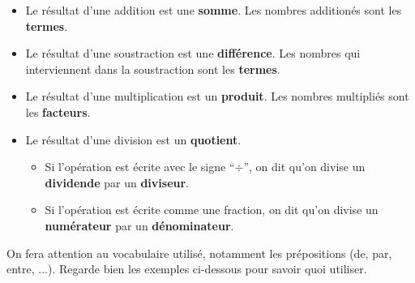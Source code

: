 \documentclass[../€Cours-complet/Cours-complet]{subfiles}
\begin{document}
\maketitleCours

\begin{cours}[Vocabulaire]
	\begin{itemize}
		\item Le résultat d'une addition est une \textbf{somme}. Les nombres additionés sont les \textbf{termes}.
		\item Le résultat d'une soustraction est une \textbf{différence}. Les nombres qui interviennent dans la soustraction sont les \textbf{termes}.
		\item Le résultat d'une multiplication est un \textbf{produit}. Les nombres multipliés sont les \textbf{facteurs}.
		\item Le résultat d'une division est un \textbf{quotient}.
		      \begin{itemize}
			      \item Si l'opération est écrite avec le signe “$÷$”, on dit qu'on divise un \textbf{dividende} par un \textbf{diviseur}.
			      \item Si l'opération est écrite comme une fraction, on dit qu'on divise un \textbf{numérateur} par un \textbf{dénominateur}.
		      \end{itemize}
	\end{itemize} \vspace{1em}

	On fera attention au vocabulaire utilisé, notamment les prépositions (de, par, entre, ...). Regarde bien les exemples ci-dessous pour savoir quoi utiliser.
\end{cours}
\end{document}
